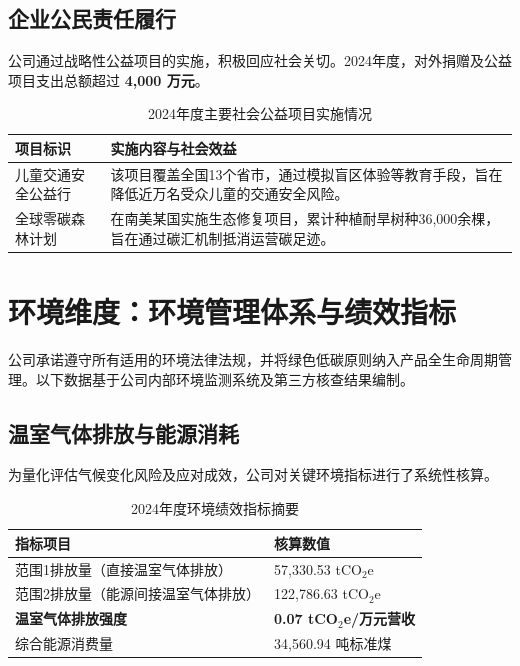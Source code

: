\documentclass[a4paper,12pt]{article}
\begin{document}
\subsection{企业公民责任履行}
公司通过战略性公益项目的实施，积极回应社会关切。2024年度，对外捐赠及公益项目支出总额超过 \textbf{4,000 万元}。

\begin{table}[h]
\centering
\caption{2024年度主要社会公益项目实施情况}
\begin{tabular}{p{} p{}}
\toprule
\textbf{项目标识} & \textbf{实施内容与社会效益} \\
\midrule
儿童交通安全公益行 & 该项目覆盖全国13个省市，通过模拟盲区体验等教育手段，旨在降低近万名受众儿童的交通安全风险。 \\
全球零碳森林计划 & 在南美某国实施生态修复项目，累计种植耐旱树种36,000余棵，旨在通过碳汇机制抵消运营碳足迹。 \\
\bottomrule
\end{tabular}
\end{table}

\section{环境维度：环境管理体系与绩效指标}

公司承诺遵守所有适用的环境法律法规，并将绿色低碳原则纳入产品全生命周期管理。以下数据基于公司内部环境监测系统及第三方核查结果编制。

\subsection{温室气体排放与能源消耗}
为量化评估气候变化风险及应对成效，公司对关键环境指标进行了系统性核算。

\begin{table}[h]
\centering
\caption{2024年度环境绩效指标摘要}
\renewcommand{\arraystretch}{1.3}
\begin{tabular}{p{} p{}}
\toprule
\textbf{指标项目} & \textbf{核算数值} \\
\midrule
范围1排放量（直接温室气体排放） & 57,330.53 tCO$_2$e \\
范围2排放量（能源间接温室气体排放） & 122,786.63 tCO$_2$e \\
\textbf{温室气体排放强度} & \textbf{0.07 tCO$_2$e/万元营收} \\
综合能源消费量 & 34,560.94 吨标准煤 \\
\bottomrule
\end{tabular}
\end{table}
\end{document}
